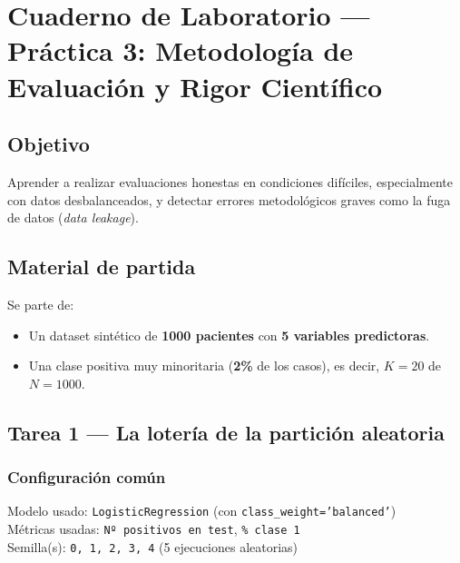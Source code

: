 \documentclass[../../__memoria.tex]{subfiles}
\begin{document}
\standalonecover
\pagestyle{cuerpo}

\graphicspath{{\subfix{../../Imagenes/}}{../../Imagenes/}{\subfix{img/}}{img/}}

\chapter[Práctica 3: Metodología y Rigor]{Cuaderno de Laboratorio --- Práctica 3: Metodología de Evaluación y Rigor Científico}

\section*{Objetivo}
Aprender a realizar evaluaciones honestas en condiciones difíciles, especialmente con datos desbalanceados,
y detectar errores metodológicos graves como la fuga de datos (\textit{data leakage}).

\section*{Material de partida}
Se parte de:
\begin{itemize}
  \item Un dataset sintético de \textbf{1000 pacientes} con \textbf{5 variables predictoras}.
  \item Una clase positiva muy minoritaria (\textbf{2\%} de los casos), es decir, $K = 20$ de $N = 1000$.
\end{itemize}

\section[Tarea 1: Lotería de la partición]{Tarea 1 --- La lotería de la partición aleatoria}

\subsection*{Configuración común}
Modelo usado: \texttt{LogisticRegression} (con \texttt{class\_weight='balanced'})\\
Métricas usadas: \texttt{Nº positivos en test}, \texttt{\% clase 1}\\
Semilla(s): \texttt{0, 1, 2, 3, 4} (5 ejecuciones aleatorias)
\end{document}
